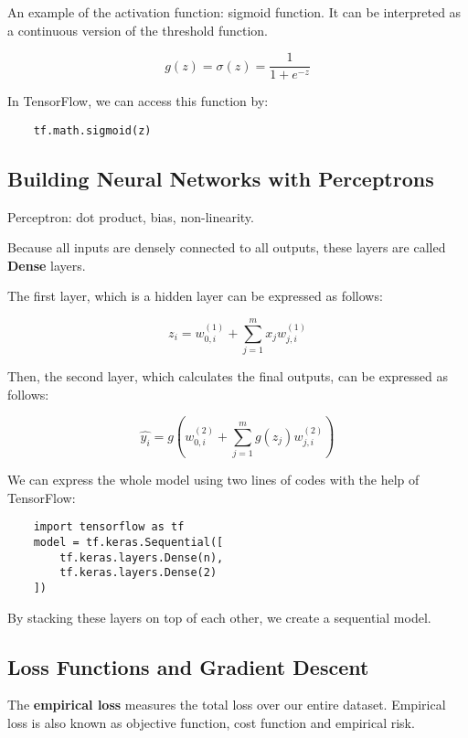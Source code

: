 \documentclass[12pt, a4paper, oneside]{article}
\begin{document}
An example of the activation function: sigmoid function. It can be interpreted as a continuous version of the threshold function.

\begin{equation*}
    g(z)=\sigma(z)=\frac{1}{1+e^{-z}}
\end{equation*}

In TensorFlow, we can access this function by:

\begin{lstlisting}
    tf.math.sigmoid(z)
\end{lstlisting}

\subsection{Building Neural Networks with Perceptrons}

Perceptron: dot product, bias, non-linearity.

Because all inputs are densely connected to all outputs, these layers are called \textbf{Dense} layers.

The first layer, which is a hidden layer can be expressed as follows:

\begin{equation*}
    z_{i}=w_{0,i}^{(1)}+\sum_{j=1}^{m}x_{j}w_{j,i}^{(1)}
\end{equation*}

Then, the second layer, which calculates the final outputs, can be expressed as follows:

\begin{equation*}
    \hat{y_{i}}=g(w_{0,i}^{(2)}+\sum_{j=1}^{m}g(z_{j})w_{j,i}^{(2)})
\end{equation*}

We can express the whole model using two lines of codes with the help of TensorFlow:

\begin{lstlisting}
    import tensorflow as tf
    model = tf.keras.Sequential([
        tf.keras.layers.Dense(n),
        tf.keras.layers.Dense(2)
    ])
\end{lstlisting}

By stacking these layers on top of each other, we create a sequential model.

\subsection{Loss Functions and Gradient Descent}

The \textbf{empirical loss} measures the total loss over our entire dataset. Empirical loss is also known as objective function, cost function and empirical risk.
\end{document}
